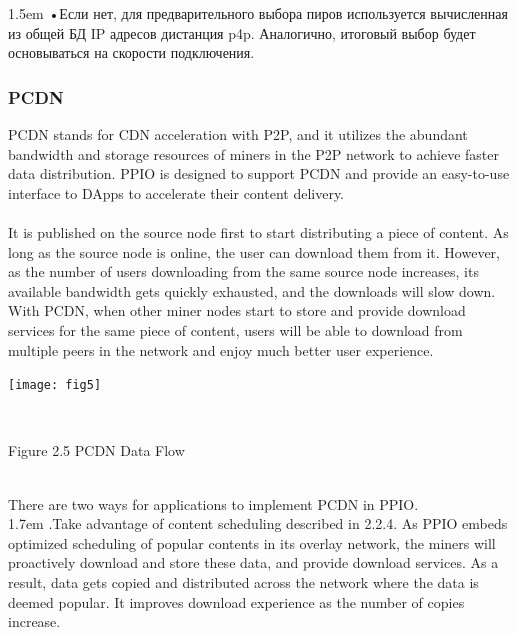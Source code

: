\documentclass[10pt,a4paper]{article}
\begin{document}
\hangindent 1.5em
\noindent   
•\quad  Если нет, для предварительного выбора пиров используется вычисленная из общей БД IP адресов дистанция p4p. Аналогично, итоговый выбор будет основываться на скорости подключения.
\vspace{-0.8em}

 
         \subsubsection{PCDN}  %
PCDN stands for CDN acceleration with P2P, and it utilizes the abundant bandwidth and storage resources of miners in the P2P network to achieve faster data distribution. PPIO is designed to support PCDN and provide an easy-to-use interface to DApps to accelerate their content delivery. 
\vspace{-0.5em}
\\ \\It is published on the source node first to start distributing a piece of content. As long as the source node is online, the user can download them from it. However, as the number of users downloading from the same source node increases, its available bandwidth gets quickly exhausted, and the downloads will slow down. With PCDN, when other miner nodes start to store and provide download services for the same piece of content, users will be able to download from multiple peers in the network and enjoy much better user experience.\\
\centerline{\texttt{[image: fig5]}}
\vspace{-0.5em}
 \\ \centerline{{Figure 2.5 PCDN Data Flow}}
\vspace{-0.5em}
 \\ There are two ways for applications to implement PCDN in PPIO.
\vspace{-0.7em}
\\

\hangindent 1.7em
.\quad Take advantage of content scheduling described in 2.2.4.  As PPIO embeds optimized scheduling of popular contents in its overlay network,  the miners will proactively download and store these data, and provide download services. As a result, data gets copied and distributed across the network where the data is deemed popular. It improves download experience as the number of copies increase. 
\vspace{-0.7em}
\\
\end{document}
